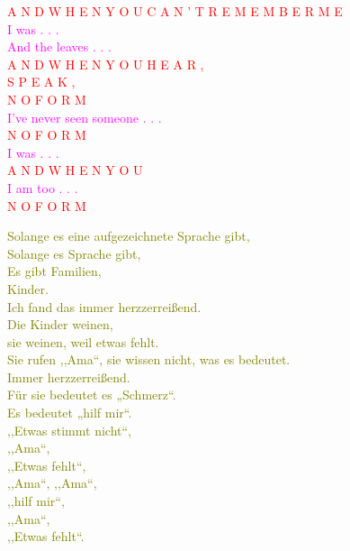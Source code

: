 \documentclass[11pt]{article}
\begin{document}
\begingroup
\begin{center}
\textcolor{red}{A N D \hspace{10mm} W H E N  \hspace{10mm} Y O U  \hspace{10mm} C A N ' T  \hspace{10mm} R E M E M B E R  \hspace{10mm} M E} \\ \textcolor{magenta}{ I was . . . \\ And the leaves . . . } \\ \textcolor{red}{A N D \hspace{10mm} W H E N \hspace{10mm} Y O U \hspace{10mm} H E A R , \\ S P E A K ,  \\ N O \hspace{10mm} F O R M  } \\ \textcolor{magenta}{ I've never seen someone . . . } \\ \textcolor{red}{N O \hspace{10mm} F O R M \\} \textcolor{magenta}{I was . . .} \\ \textcolor{red}{A N D \hspace{10mm} W H E N \hspace{10mm} Y O U} \\ \textcolor{magenta}{I am too . . . } \\ \textcolor{red}{N O \hspace{10mm} F O R M}
\end{center}
\endgroup

\vspace*{1\baselineskip}

\begingroup
\begin{center}
\textcolor{olive}{Solange es eine aufgezeichnete Sprache gibt, \\ Solange es Sprache gibt, \\ Es gibt Familien, \\ Kinder. \\ Ich fand das immer herzzerreißend. \\ Die Kinder weinen, \\ sie weinen, weil etwas fehlt. \\ 
Sie rufen ,,Ama“, sie wissen nicht, was es bedeutet. \\ Immer herzzerreißend. \\ Für sie bedeutet es „Schmerz“. \\ Es bedeutet „hilf mir“. \\ ,,Etwas stimmt nicht“, \\ ,,Ama“, \\ ,,Etwas fehlt“, \\ ,,Ama“, ,,Ama“, \\ ,,hilf mir“, \\ ,,Ama“, \\ ,,Etwas fehlt“.}
\end{center}
\endgroup
\end{document}
